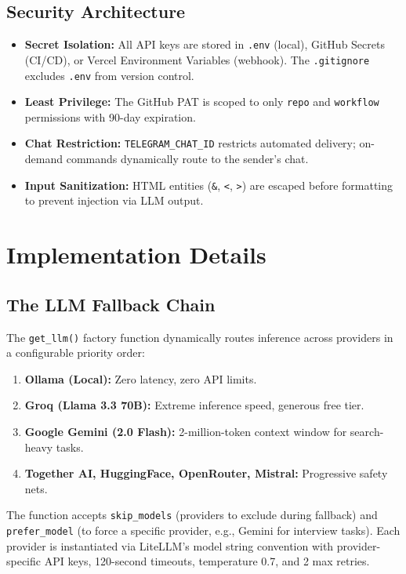 \documentclass[12pt,a4paper]{report}
\begin{document}
\section{Security Architecture}
\begin{itemize}
    \item \textbf{Secret Isolation:} All API keys are stored in \texttt{.env} (local), GitHub Secrets (CI/CD), or Vercel Environment Variables (webhook). The \texttt{.gitignore} excludes \texttt{.env} from version control.
    \item \textbf{Least Privilege:} The GitHub PAT is scoped to only \texttt{repo} and \texttt{workflow} permissions with 90-day expiration.
    \item \textbf{Chat Restriction:} \texttt{TELEGRAM\_CHAT\_ID} restricts automated delivery; on-demand commands dynamically route to the sender's chat.
    \item \textbf{Input Sanitization:} HTML entities (\texttt{\&}, \texttt{<}, \texttt{>}) are escaped before formatting to prevent injection via LLM output.
\end{itemize}

\chapter{Implementation Details}

\section{The LLM Fallback Chain}
The \texttt{get\_llm()} factory function dynamically routes inference across providers in a configurable priority order:
\begin{enumerate}
    \item \textbf{Ollama (Local):} Zero latency, zero API limits.
    \item \textbf{Groq (Llama 3.3 70B):} Extreme inference speed, generous free tier.
    \item \textbf{Google Gemini (2.0 Flash):} 2-million-token context window for search-heavy tasks.
    \item \textbf{Together AI, HuggingFace, OpenRouter, Mistral:} Progressive safety nets.
\end{enumerate}

The function accepts \texttt{skip\_models} (providers to exclude during fallback) and \texttt{prefer\_model} (to force a specific provider, e.g., Gemini for interview tasks). Each provider is instantiated via LiteLLM's model string convention with provider-specific API keys, 120-second timeouts, temperature 0.7, and 2 max retries.
\end{document}

